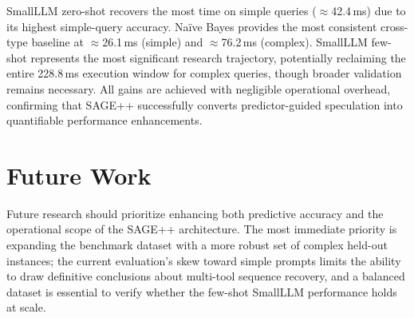 \documentclass[conference]{IEEEtran}
\begin{document}
\begin{table}[!htbp]
\centering
\caption{SAGE++ time savings per query.
  (*) complex result from held-out $n{=}3$; interpret with caution.}
\label{tab:savings}
\renewcommand{\arraystretch}{1.3}
\end{table}

SmallLLM zero-shot recovers the most time on simple queries ($\approx$42.4\,ms)
due to its highest simple-query accuracy.
Na\"{i}ve Bayes provides the most consistent cross-type baseline at
$\approx$26.1\,ms (simple) and $\approx$76.2\,ms (complex).
SmallLLM few-shot represents the most significant research trajectory,
potentially reclaiming the entire 228.8\,ms execution window for complex queries,
though broader validation remains necessary.
All gains are achieved with negligible operational overhead, confirming that
SAGE++ successfully converts predictor-guided speculation into quantifiable
performance enhancements.

\section{Future Work}
Future research should prioritize enhancing both predictive accuracy and the
operational scope of the SAGE++ architecture.
The most immediate priority is expanding the benchmark dataset with a more robust
set of complex held-out instances; the current evaluation's skew toward simple
prompts limits the ability to draw definitive conclusions about multi-tool
sequence recovery, and a balanced dataset is essential to verify whether the
few-shot SmallLLM performance holds at scale.
\end{document}

